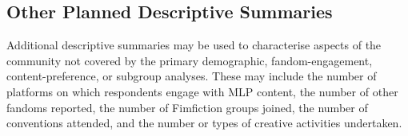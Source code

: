 
\subsection{Other Planned Descriptive Summaries}

Additional descriptive summaries may be used to characterise aspects of the community not covered by the primary demographic, fandom-engagement, content-preference, or subgroup analyses. These may include the number of platforms on which respondents engage with MLP content, the number of other fandoms reported, the number of Fimfiction groups joined, the number of conventions attended, and the number or types of creative activities undertaken.

